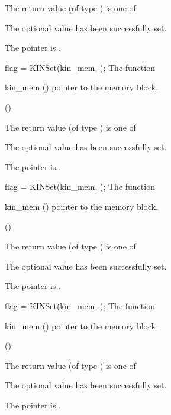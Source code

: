 {
  The return value  (of type ) is one of
  \begin{args}
  \item[\Id{KIN\_SUCCESS}] 
    The optional value has been successfully set.
  \item[\Id{KIN\_MEM\_NULL}]
    The  pointer is .
  \end{args}
}
{}
{
flag = KINSet(kin\_mem, );
}
{
  The function 
}
{
  \begin{args}
  \item[kin\_mem] ()
    pointer to the {\kinsol} memory block.
  \item[] (\id{})

  \end{args}
}
{
  The return value  (of type ) is one of
  \begin{args}
  \item[\Id{KIN\_SUCCESS}] 
    The optional value has been successfully set.
  \item[\Id{KIN\_MEM\_NULL}]
    The  pointer is .
  \end{args}
}
{}
{
flag = KINSet(kin\_mem, );
}
{
  The function 
}
{
  \begin{args}
  \item[kin\_mem] ()
    pointer to the {\kinsol} memory block.
  \item[] (\id{})

  \end{args}
}
{
  The return value  (of type ) is one of
  \begin{args}
  \item[\Id{KIN\_SUCCESS}] 
    The optional value has been successfully set.
  \item[\Id{KIN\_MEM\_NULL}]
    The  pointer is .
  \end{args}
}
{}
{
flag = KINSet(kin\_mem, );
}
{
  The function 
}
{
  \begin{args}
  \item[kin\_mem] ()
    pointer to the {\kinsol} memory block.
  \item[] (\id{})

  \end{args}
}
{
  The return value  (of type ) is one of
  \begin{args}
  \item[\Id{KIN\_SUCCESS}] 
    The optional value has been successfully set.
  \item[\Id{KIN\_MEM\_NULL}]
    The  pointer is .
  \end{args}
}
